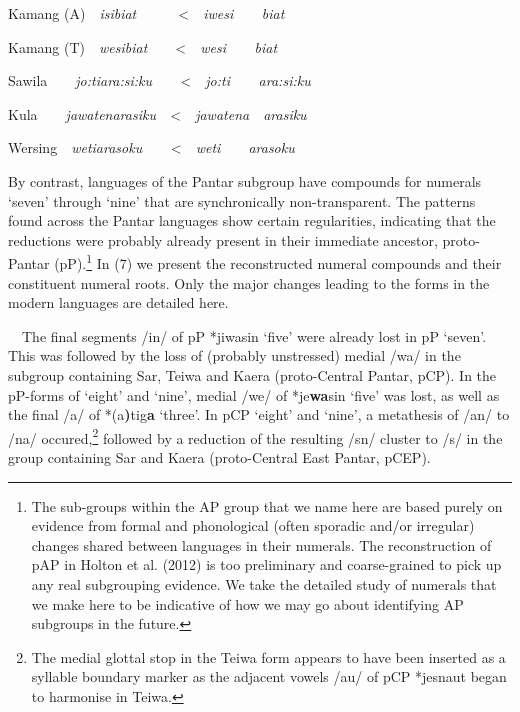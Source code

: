 Kamang (A)\ \ \textit{isi{\ng}biat}\ \ \ \ \ \ {\textless}\ \ \textit{iwesi{\ng}\ \ \ \ biat}

Kamang (T)\ \ \textit{wesi{\ng}biat}\ \ \ \ {\textless}\ \ \textit{wesi{\ng}\ \ \ \ biat}

Sawila\ \ \ \ \textit{jo:ti{\ng}ara:si:ku\ \ }\ \ {\textless}\ \ \textit{jo:ti{\ng}\ \ \ \ ara:si:ku}

Kula\ \ \ \ \textit{jawatenarasiku\ \ }{\textless}\ \ \textit{jawatena}\ \ \textit{arasiku}

Wersing\ \ \textit{weti{\ng}arasoku\ \ \ \ }{\textless}\ \ \textit{weti{\ng}}\ \ \ \ \textit{arasoku}

By contrast, languages of the Pantar subgroup have compounds for numerals {\textquoteleft}seven{\textquoteright} through {\textquoteleft}nine{\textquoteright} that are synchronically non-transparent. The patterns found across the Pantar languages show certain regularities, indicating that the reductions were probably already present in their immediate ancestor, proto-Pantar (pP).\footnote{The sub-groups within the AP group that we name here are based purely on evidence from formal and phonological (often sporadic and/or irregular) changes shared between languages in their numerals. The reconstruction of pAP in Holton et al. (2012) is too preliminary and coarse-grained to pick up any real subgrouping evidence. We take the detailed study of numerals that we make here to be indicative of how we may go about identifying AP subgroups in the future. } In (7) we present the reconstructed numeral compounds and their constituent numeral roots. Only the major changes leading to the forms in the modern languages are 
detailed here. 

\ \ The final segments /in/ of pP *jiwasin {\textquoteleft}five{\textquoteright} were already lost in pP {\textquoteleft}seven{\textquoteright}. This was followed by the loss of (probably unstressed) medial /wa/ in the subgroup containing Sar, Teiwa and Kaera (proto-Central Pantar, pCP). In the pP-forms of {\textquoteleft}eight{\textquoteright} and {\textquoteleft}nine{\textquoteright}, medial /we/ of *je\textbf{wa}sin {\textquoteleft}five{\textquoteright} was lost, as well as the final /a/ of *(a\textbf{)}tig\textbf{a} {\textquoteleft}three{\textquoteright}. In pCP {\textquoteleft}eight{\textquoteright} and {\textquoteleft}nine{\textquoteright}, a metathesis of /an/ to /na/ occured,\footnote{The medial glottal stop in the Teiwa form appears to have been inserted as a syllable boundary marker as the adjacent vowels /au/ of pCP *jesnaut began to harmonise in Teiwa. } followed by a reduction of the resulting /sn/ cluster to /s/ in the group containing Sar and Kaera (proto-Central East Pantar, pCEP). 

